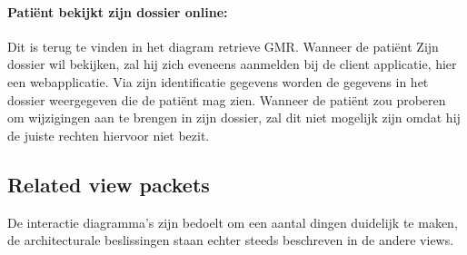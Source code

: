 \documentclass[a4paper,10pt]{article}
\begin{document}
\paragraph{Patiënt bekijkt zijn dossier online:}
Dit is terug te vinden in het diagram retrieve GMR. Wanneer de patiënt Zijn dossier wil bekijken, zal hij zich eveneens aanmelden bij de client applicatie, hier een webapplicatie. Via zijn identificatie gegevens worden de gegevens in het dossier weergegeven die de patiënt mag zien. Wanneer de patiënt zou proberen om wijzigingen aan te brengen in zijn dossier, zal dit niet mogelijk zijn omdat hij de juiste rechten hiervoor niet bezit.

\subsection{Related view packets}
De interactie diagramma's zijn bedoelt om een aantal dingen duidelijk te maken, de architecturale beslissingen staan echter steeds beschreven in de andere views.
\end{document}
